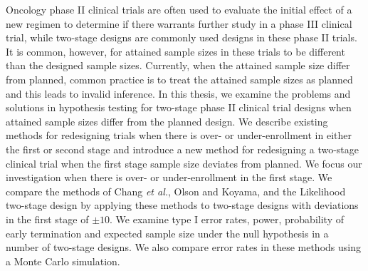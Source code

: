 \documentclass[12pt]{report}\usepackage[]{graphicx}\usepackage[]{color}
\newlength{\li}\setlength{\li}{14.48pt}
\newlength{\di}\setlength{\di}{-3.5mm}
\begin{document}
\vspace{7mm}
Oncology phase II clinical trials are often used to evaluate the initial effect of a new regimen to determine if there warrants further study in a phase III clinical trial, while two-stage designs are commonly used designs in these phase II trials. It is common, however, for attained sample sizes in these trials to be different than the designed sample sizes. Currently, when the attained sample size differ from planned, common practice is to treat the attained sample sizes as planned and this leads to invalid inference. In this thesis, we examine the problems and solutions in hypothesis testing for two-stage phase II clinical trial designs when attained sample sizes differ from the planned design. We describe existing methods for redesigning trials when there is over- or under-enrollment in either the first or second stage and introduce a new method for redesigning a two-stage clinical trial when the first stage sample size deviates from planned. We focus our investigation when there is over- or under-enrollment in the first stage. We compare the methods of Chang \textit{et al.}, Olson and Koyama, and the Likelihood two-stage design by applying these methods to two-stage designs with deviations in the first stage of $\pm 10$. We examine type I error rates, power, probability of early termination and expected sample size under the null hypothesis in a number of two-stage designs. We also compare error rates in these methods using a Monte Carlo simulation. 

\newpage

\normalsize
\doublespacing
{}
\setcounter{page}{1}
\end{document}

